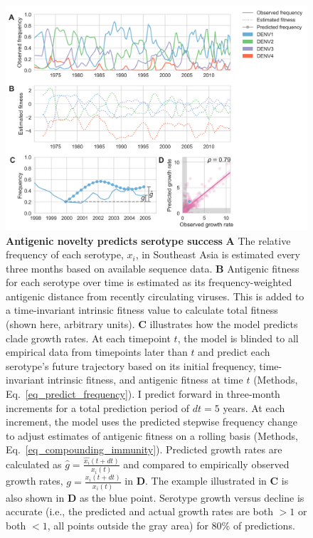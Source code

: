 \begin{figure}[ht!]
  \begin{centering}
    \includegraphics[width=.9\linewidth]{./png/serotype_fitness_model.png}
  	\caption[Antigenic novelty predicts serotype success]{\textbf{Antigenic novelty predicts serotype success }
    \textbf{A} The relative frequency of each serotype, $x_i$, in Southeast Asia is estimated every three months based on available sequence data.
    \textbf{B} Antigenic fitness for each serotype over time is estimated as its frequency-weighted antigenic distance from recently circulating viruses.
    This is added to a time-invariant intrinsic fitness value to calculate total fitness (shown here, arbitrary units).
    \textbf{C} illustrates how the model predicts clade growth rates.
    At each timepoint $t$, the model is blinded to all empirical data from timepoints later than $t$ and predict each serotype's future trajectory based on its initial frequency, time-invariant intrinsic fitness, and antigenic fitness at time $t$ (Methods, Eq.~\ref{eq_predict_frequency}).
    I predict forward in three-month increments for a total prediction period of $dt = 5$ years.
    At each increment, the model uses the predicted stepwise frequency change to adjust estimates of antigenic fitness on a rolling basis (Methods, Eq.~\ref{eq_compounding_immunity}).
    Predicted growth rates are calculated as $\hat{g} = \frac{\hat{x_i}(t+dt)}{x_i(t)}$ and compared to empirically observed growth rates, $g = \frac{x_i(t+dt)}{x_i(t)}$ in \textbf{D}.
    The example illustrated in \textbf{C} is also shown in \textbf{D} as the blue point.
    Serotype growth versus decline is accurate (i.e., the predicted and actual growth rates are both $>1$ or both $<1$, all points outside the gray area) for 80\% of predictions.
    }
  	\label{serotype_fitness_model}
  \end{centering}
\end{figure}

